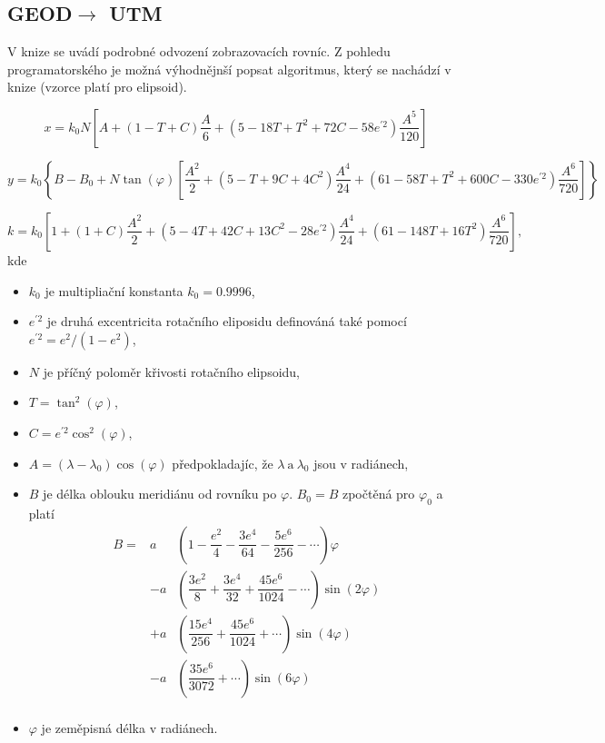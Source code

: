 \subsection{GEOD$\rightarrow$ UTM}

V knize \cite{Buchar2002} se uvádí podrobné odvození zobrazovacích rovníc. Z pohledu programatorského je možná výhodnějnší popsat algoritmus, který se nachádzí v knize \cite{Snyder1987} (vzorce platí pro elipsoid).

\begin{equation}
x = k_{0}N\left[A + \left(1-T+C\right)\dfrac{A}{6} + \left(5-18T+T^{2}+72C-58e^{'2}\right)\dfrac{A^{5}}{120}\right]
\end{equation}	

\begin{equation}
y = k_{0}\left\lbrace B - B_{0} + N \tan{\left(\varphi\right)\left[\dfrac{A^{2}}{2} + \left(5-T+9C+4C^{2}\right)\dfrac{A^{4}}{24}+\left(61-58T+T^{2}+600C-330e^{'2}\right)\dfrac{A^{6}}{720}\right]}\right\rbrace
\end{equation}

\begin{equation}
k = k_{0}\left[1+\left(1+C\right)\dfrac{A^{2}}{2}+\left(5-4T+42C+13C^{2}-28e^{'2}\right)\dfrac{A^{4}}{24} + \left(61-148T+16T^{2}\right)\dfrac{A^{6}}{720}\right],
\end{equation}
kde
\begin{itemize}
\item $k_{0}$ je multipliační konstanta $k_{0} = 0.9996$,
\item $e^{'2}$ je druhá excentricita rotačního eliposidu definováná také pomocí $e^{'2} = e^{2}/\left(1-e^{2}\right)$,
\item $N$ je příčný poloměr křivosti rotačního elipsoidu, 
\item $T = \tan^{2}{\left(\varphi\right)}$,
\item $C = e^{'2}\cos^{2}{\left(\varphi\right)}$,
\item $A = \left(\lambda-\lambda_{0}\right)\cos{\left(\varphi\right)}$ předpokladajíc, že $\lambda\ \text{a}\ \lambda_{0}$ jsou v radiánech,
\item $B$ je délka oblouku meridiánu od rovníku po $\varphi$. $B_{0} = B$ zpočtěná pro $\varphi_{0}$ a platí
\begin{eqnarray}\label{rov:B}
B = & a & \left(1 - \dfrac{e^{2}}{4} - \dfrac{3e^{4}}{64} - \dfrac{5e^{6}}{256} - \cdots \right)\varphi \\ \nonumber
    & -a & \left(\dfrac{3e^{2}}{8} + \dfrac{3e^{4}}{32} + \dfrac{45e^{6}}{1024} - \cdots\right)\sin{\left(2\varphi\right)}\\ \nonumber
    & +a & \left(\dfrac{15e^{4}}{256} + \dfrac{45e^{6}}{1024} + \cdots\right)\sin{\left(4\varphi\right)}\\ \nonumber
    & -a & \left(\dfrac{35e^{6}}{3072} + \cdots\right)\sin{\left(6\varphi\right)}\\ \nonumber
\end{eqnarray}
\item $\varphi$ je zeměpisná délka v radiánech.
\end{itemize}

